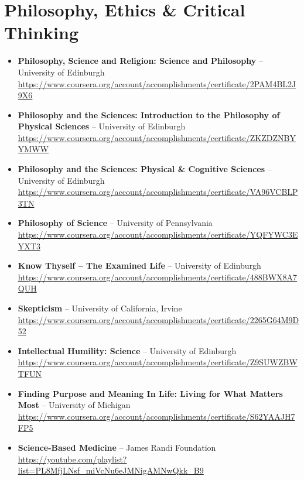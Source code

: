 \documentclass[11pt,a4paper]{article}
\begin{document}
\section{Philosophy, Ethics \& Critical Thinking}
\begin{itemize}
    \item \textbf{Philosophy, Science and Religion: Science and Philosophy} – University of Edinburgh\\
    \url{https://www.coursera.org/account/accomplishments/certificate/2PAM4BL2J9X6}

    \item \textbf{Philosophy and the Sciences: Introduction to the Philosophy of Physical Sciences} – University of Edinburgh\\
    \url{https://www.coursera.org/account/accomplishments/certificate/ZKZDZNBYYMWW}

    \item \textbf{Philosophy and the Sciences: Physical \& Cognitive Sciences} – University of Edinburgh\\
    \url{https://www.coursera.org/account/accomplishments/certificate/VA96VCBLP3TN}

    \item \textbf{Philosophy of Science} – University of Pennsylvania\\
    \url{https://www.coursera.org/account/accomplishments/certificate/YQFYWC3EYXT3}

    \item \textbf{Know Thyself – The Examined Life} – University of Edinburgh\\
    \url{https://www.coursera.org/account/accomplishments/certificate/488BWX8A7QUH}

    \item \textbf{Skepticism} – University of California, Irvine\\
    \url{https://www.coursera.org/account/accomplishments/certificate/2265G64M9D52}

    \item \textbf{Intellectual Humility: Science} – University of Edinburgh\\
    \url{https://www.coursera.org/account/accomplishments/certificate/Z9SUWZBWTFUN}

    \item \textbf{Finding Purpose and Meaning In Life: Living for What Matters Most} – University of Michigan\\
    \url{https://www.coursera.org/account/accomplishments/certificate/S62YAAJH7FP5}

    \item \textbf{Science-Based Medicine} – James Randi Foundation\\
    \url{https://youtube.com/playlist?list=PL8MfjLNsf_miVcNu6eJMNigAMNwQkk_B9}
\end{itemize}
\end{document}
